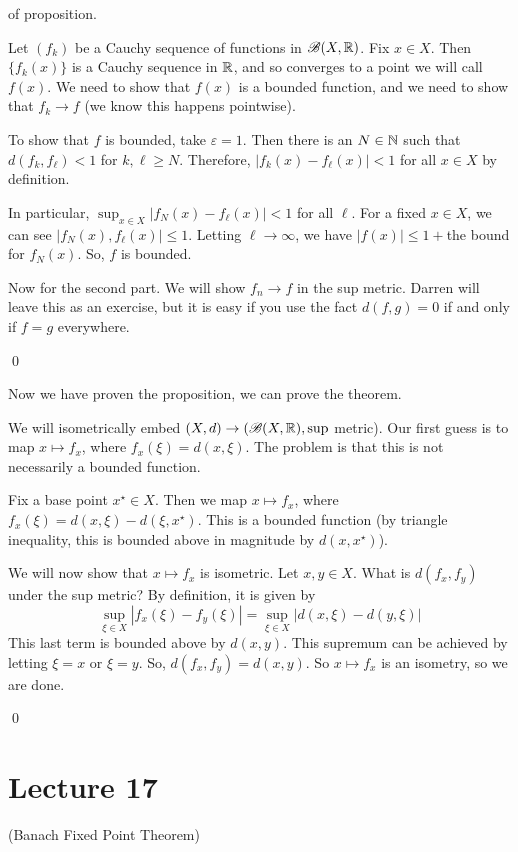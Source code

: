 \documentclass[x11names,reqno,14pt]{extarticle}
\newcommand*{\oo}{{\infty}}
\begin{document}
\proof of proposition.

Let $(f_k)$ be a Cauchy sequence of functions in $\mathscr{B}(X, \mathbb{R})$. Fix $x \in X$. Then $\{f_k(x)\}$ is a Cauchy sequence in $\mathbb{R}$, and so converges to a point we will call $f(x)$. We need to show that $f(x)$ is a bounded function, and we need to show that $f_k \to f$ (we know this happens pointwise). 

To show that $f$ is bounded, take $\varepsilon = 1$. Then there is an $N \in \mathbb{N}$ such that $d(f_k, f_\ell)< 1$ for $k, \ell \geq N$. Therefore, $|f_k(x) - f_\ell(x)| < 1$ for all $x \in X$ by definition. 

In particular, $\sup_{x\in X}|f_N(x) - f_\ell(x)| < 1$ for all $\ell$. For a fixed $x\in X$, we can see $|f_N(x), f_\ell(x)| \leq 1$. Letting $\ell\to\oo$, we have $|f(x)| \leq 1 + $the bound for $f_N(x)$. So, $f$ is bounded. 

Now for the second part. We will show $f_n \to f$ in the sup metric. Darren will leave this as an exercise, but it is easy if you use the fact $d(f, g) = 0$ if and only if $f = g$ everywhere. 

\qed

Now we have proven the proposition, we can prove the theorem. 

We will isometrically embed $(X, d)\to(\mathscr{B}(X, \mathbb{R}), \sup$ metric). Our first guess is to map $x\mapsto f_x$, where $f_x(\xi) = d(x, \xi)$. The problem is that this is not necessarily a bounded function. 

Fix a base point $x^\star \in X$. Then we map $x\mapsto f_x$, where $f_x(\xi) = d(x, \xi) - d(\xi, x^\star)$. This is a bounded function (by triangle inequality, this is bounded above in magnitude by $d(x, x^\star)$). 

We will now show that $x \mapsto f_x$ is isometric. Let $x, y \in X$. What is $d(f_x, f_y)$ under the sup metric? By definition, it is given by 
\[
\sup_{\xi\in X}|f_x(\xi) - f_y(\xi)| = \sup_{\xi\in X}|d(x, \xi) - d(y, \xi)| 
\]
This last term is bounded above by $d(x, y)$. This supremum can be achieved by letting $\xi = x$ or $\xi = y$. So, $d(f_x, f_y) = d(x, y)$. So $x\mapsto f_x$ is an isometry, so we are done. 

\qed

\section*{Lecture 17}

\thm (Banach Fixed Point Theorem)
\end{document}

